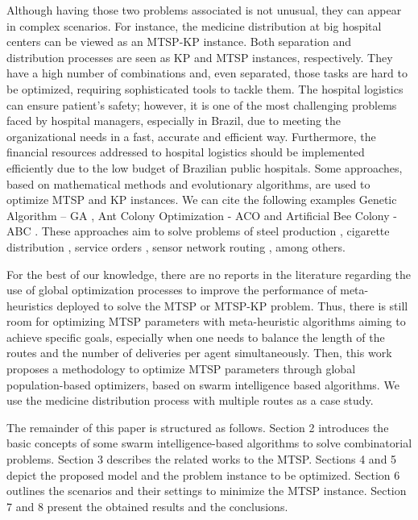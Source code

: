 \documentclass[runningheads]{llncs}
\begin{document}
Although having those two problems associated is not unusual, they can appear in complex scenarios. For instance, the medicine distribution at big hospital centers can be viewed as an MTSP-KP instance. Both separation and distribution processes are seen as KP and MTSP instances, respectively. They have a high number of combinations and, even separated, those tasks are hard to be optimized, requiring sophisticated tools to tackle them. The hospital logistics can ensure patient's safety; however, it is one of the most challenging problems faced by hospital managers, especially in Brazil, due to meeting the organizational needs in a fast, accurate and efficient way. Furthermore, the financial resources addressed to hospital logistics should be implemented efficiently due to the low budget of Brazilian public hospitals.
Some approaches, based on mathematical methods and evolutionary algorithms, are used to optimize MTSP and KP instances. We can cite the following examples Genetic Algorithm – GA \cite{holland1992genetic}, Ant Colony Optimization - ACO \cite{dorigo2008particle} and Artificial Bee Colony - ABC \cite{karaboga2005idea}. These approaches aim to solve problems of steel production \cite{tang2000multiple}, cigarette distribution \cite{liu2009ant}, service orders \cite{barbosa2015aplicaccao}, sensor network routing \cite{wang2007hierarchical}, among others.

For the best of our knowledge, there are no reports in the literature regarding the use of global optimization processes to improve the performance of meta-heuristics deployed to solve the MTSP or MTSP-KP problem. Thus, there is still room for optimizing MTSP parameters with meta-heuristic algorithms aiming to achieve specific goals, especially when one needs to balance the length of the routes and the number of deliveries per agent simultaneously. Then, this work proposes a methodology to optimize MTSP parameters through global population-based optimizers, based on swarm intelligence based algorithms. We use the medicine distribution process with multiple routes as a case study.

The remainder of this paper is structured as follows. Section 2 introduces the basic concepts of some swarm intelligence-based algorithms to solve combinatorial problems. Section 3 describes the related works to the MTSP. Sections 4 and 5 depict the proposed model and the problem instance to be optimized. Section 6 outlines the scenarios and their settings to minimize the MTSP instance. Section 7 and 8 present the obtained results and the conclusions.
\end{document}
